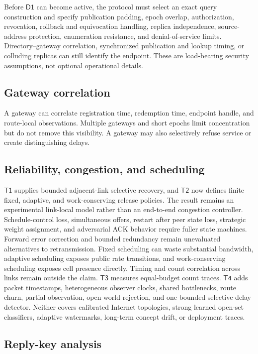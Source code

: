 \documentclass[11pt,oneside]{article}
\newcommand{\Tone}{\ensuremath{\mathsf{T1}}}
\newcommand{\Ttwo}{\ensuremath{\mathsf{T2}}}
\newcommand{\Tthree}{\ensuremath{\mathsf{T3}}}
\newcommand{\Tfour}{\ensuremath{\mathsf{T4}}}
\newcommand{\Done}{\ensuremath{\mathsf{D1}}}
\begin{document}
Before \Done{} can become active, the protocol must select an exact query construction and specify publication padding, epoch overlap, authorization, revocation, rollback and equivocation handling, replica independence, source-address protection, enumeration resistance, and denial-of-service limits. Directory--gateway correlation, synchronized publication and lookup timing, or colluding replicas can still identify the endpoint. These are load-bearing security assumptions, not optional operational details.

\subsection{Gateway correlation}

A gateway can correlate registration time, redemption time, endpoint handle, and route-local observations. Multiple gateways and short epochs limit concentration but do not remove this visibility. A gateway may also selectively refuse service or create distinguishing delays.

\subsection{Reliability, congestion, and scheduling}

\Tone{} supplies bounded adjacent-link selective recovery, and \Ttwo{} now defines finite fixed, adaptive, and work-conserving release policies. The result remains an experimental link-local model rather than an end-to-end congestion controller. Schedule-control loss, simultaneous offers, restart after peer state loss, strategic weight assignment, and adversarial ACK behavior require fuller state machines. Forward error correction and bounded redundancy remain unevaluated alternatives to retransmission. Fixed scheduling can waste substantial bandwidth, adaptive scheduling exposes public rate transitions, and work-conserving scheduling exposes cell presence directly. Timing and count correlation across links remain outside the claim. \Tthree{} measures equal-budget count traces. \Tfour{} adds packet timestamps, heterogeneous observer clocks, shared bottlenecks, route churn, partial observation, open-world rejection, and one bounded selective-delay detector. Neither covers calibrated Internet topologies, strong learned open-set classifiers, adaptive watermarks, long-term concept drift, or deployment traces.

\subsection{Reply-key analysis}
\end{document}
